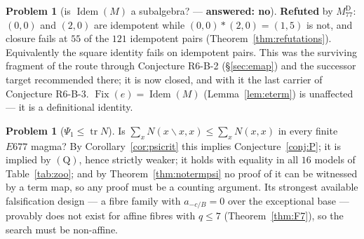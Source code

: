 \documentclass[11pt]{article}
\theoremstyle{plain}
\theoremstyle{definition}
\newtheorem{problem}[theorem]{Problem}
\theoremstyle{remark}
\numberwithin{equation}{section}
\newcommand{\op}{\mathbin{*}}
\newcommand{\Fix}{\operatorname{Fix}}
\newcommand{\tr}{\operatorname{tr}}
\newcommand{\Idem}{\operatorname{Idem}}
\begin{document}
\begin{problem}[is $\Idem(M)$ a subalgebra? --- \textbf{answered:
no}]\label{prob:idemsub}
\textbf{Refuted} by $M_{77}^{\mathrm{D}}$: $(0,0)$ and $(2,0)$ are idempotent while
$(0,0)\op(2,0) = (1,5)$ is not, and closure fails at $55$ of the $121$ idempotent
pairs (Theorem~\ref{thm:refutations}). Equivalently the square identity fails on
idempotent pairs. This was the surviving fragment of the route through
Conjecture R6-B-2 (\S\ref{sec:emap}) and the successor target recommended there;
it is now closed, and with it the last carrier of Conjecture R6-B-3.
$\Fix(e) = \Idem(M)$ (Lemma~\ref{lem:eterm}) is unaffected --- it is a
definitional identity.
\end{problem}

\begin{problem}[$\Psi_1\le\tr N$]\label{prob:psi}
Is $\sum_xN(x\backslash x,x)\le\sum_xN(x,x)$ in every finite $E677$ magma? By
Corollary~\ref{cor:psicrit} this implies Conjecture~\ref{conj:P}; it is implied by
$(\mathrm{Q})$, hence strictly weaker; it holds with equality in all $16$ models of
Table~\ref{tab:zoo}; and by Theorem~\ref{thm:notermpsi} no proof of it can be witnessed by
a term map, so any proof must be a counting argument. Its strongest available
falsification design --- a fibre family with $a_{-c/B} = 0$ over the exceptional base ---
provably does not exist for affine fibres with $q\le7$ (Theorem~\ref{thm:F7}), so the
search must be non-affine.
\end{problem}
\end{document}
